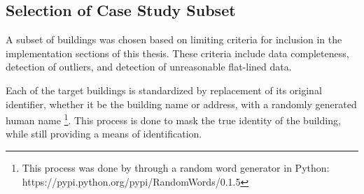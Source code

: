 \subsection{Selection of Case Study Subset}
\label{casestudysubset}

A subset of buildings was chosen based on limiting criteria for inclusion in the implementation sections of this thesis. These criteria include data completeness, detection of outliers, and detection of unreasonable flat-lined data.

Each of the target buildings is standardized by replacement of its original identifier, whether it be the building name or address, with a randomly generated human name \footnote{This process was done by through a random word generator in Python: https://pypi.python.org/pypi/RandomWords/0.1.5}. This process is done to mask the true identity of the building, while still providing a means of identification.